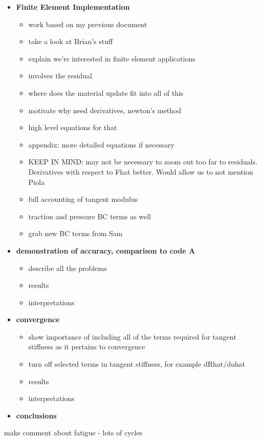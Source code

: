 \begin{itemize}
\item {\bf Finite Element Implementation}
\begin{itemize}
\item work based on my previous document
\item take a look at Brian's stuff
\item explain we're interested in finite element applications
\item involves the residual
\item where does the material update fit into all of this
\item motivate why need derivatives, newton's method
\item high level equations for that
\item appendix: more detailed equations if necessary
\item KEEP IN MIND: may not be necessary to zoom out too far to residuals. Derivatives with respect to Fhat better. Would allow us to not mention Piola
\item full accounting of tangent modulus
\item traction and pressure BC terms as well
\item grab new BC terms from Sam
\end{itemize}

\item {\bf demonstration of accuracy, comparison to code A}
\begin{itemize}
\item describe all the problems
\item results
\item interpretations
\end{itemize}

\item {\bf convergence}
\begin{itemize}
\item show importance of including all of the terms required for tangent stiffness as it pertains to convergence
\item turn off selected terms in tangent stiffness, for example dRhat/duhat
\item results
\item interpretations
\end{itemize}

\item {\bf conclusions}

\end{itemize}


make comment about fatigue - lots of cycles

